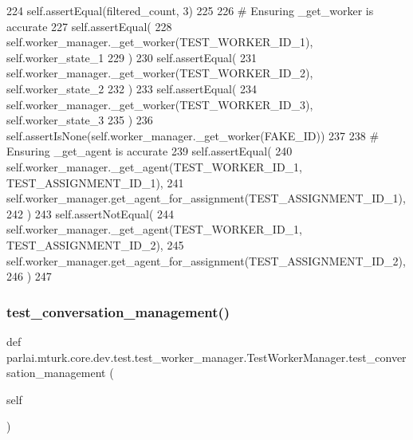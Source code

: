 \begin{DoxyCode}
224         self.assertEqual(filtered\_count, 3)
225 
226         \textcolor{comment}{# Ensuring \_get\_worker is accurate}
227         self.assertEqual(
228             self.worker\_manager.\_get\_worker(TEST\_WORKER\_ID\_1), self.worker\_state\_1
229         )
230         self.assertEqual(
231             self.worker\_manager.\_get\_worker(TEST\_WORKER\_ID\_2), self.worker\_state\_2
232         )
233         self.assertEqual(
234             self.worker\_manager.\_get\_worker(TEST\_WORKER\_ID\_3), self.worker\_state\_3
235         )
236         self.assertIsNone(self.worker\_manager.\_get\_worker(FAKE\_ID))
237 
238         \textcolor{comment}{# Ensuring \_get\_agent is accurate}
239         self.assertEqual(
240             self.worker\_manager.\_get\_agent(TEST\_WORKER\_ID\_1, TEST\_ASSIGNMENT\_ID\_1),
241             self.worker\_manager.get\_agent\_for\_assignment(TEST\_ASSIGNMENT\_ID\_1),
242         )
243         self.assertNotEqual(
244             self.worker\_manager.\_get\_agent(TEST\_WORKER\_ID\_1, TEST\_ASSIGNMENT\_ID\_2),
245             self.worker\_manager.get\_agent\_for\_assignment(TEST\_ASSIGNMENT\_ID\_2),
246         )
247 
\end{DoxyCode}
\mbox{\label{classparlai_1_1mturk_1_1core_1_1dev_1_1test_1_1test__worker__manager_1_1TestWorkerManager_a3e096b61b3202fea706fd54d6cbe1a9a}} 
\subsubsection{\texorpdfstring{test\+\_\+conversation\+\_\+management()}{test\_conversation\_management()}}
{\footnotesize\ttfamily def parlai.\+mturk.\+core.\+dev.\+test.\+test\+\_\+worker\+\_\+manager.\+Test\+Worker\+Manager.\+test\+\_\+conversation\+\_\+management (\begin{DoxyParamCaption}\item[{}]{self }\end{DoxyParamCaption})}

